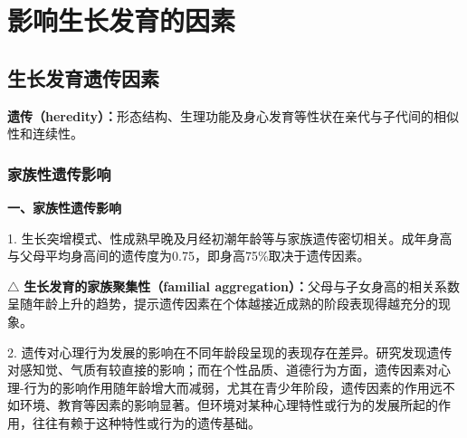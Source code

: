 \chapter{影响生长发育的因素}
\setcounter{chapter}{6}

\section{生长发育遗传因素}

\begin{defbox}
\textbf{遗传（heredity）：}形态结构、生理功能及身心发育等性状在亲代与子代间的相似性和连续性。
\end{defbox}

\subsection{家族性遗传影响}

\begin{keybox}
\textbf{一、家族性遗传影响}

1. 生长突增模式、性成熟早晚及月经初潮年龄等与家族遗传密切相关。成年身高与父母平均身高间的遗传度为0.75，即身高75\%取决于遗传因素。

$\triangle$ \textbf{生长发育的家族聚集性（familial aggregation）：}父母与子女身高的相关系数呈随年龄上升的趋势，提示遗传因素在个体越接近成熟的阶段表现得越充分的现象。

2. 遗传对心理行为发展的影响在不同年龄段呈现的表现存在差异。研究发现遗传对感知觉、气质有较直接的影响；而在个性品质、道德行为方面，遗传因素对心理-行为的影响作用随年龄增大而减弱，尤其在青少年阶段，遗传因素的作用远不如环境、教育等因素的影响显著。但环境对某种心理特性或行为的发展所起的作用，往往有赖于这种特性或行为的遗传基础。
\end{keybox}

